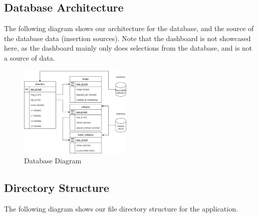 \documentclass[conference]{IEEEtran}
\begin{document}
\newpage
\subsection{Database Architecture}
The following diagram shows our architecture for the database, and the source of the database data (insertion sources). Note that the dashboard is not showcased here, as the dashboard mainly only does selections from the database, and is not a source of data.

\begin{figure}[h]
    \centering
    \includegraphics[width=0.48\textwidth]{images/db_diagram.eps}
    \caption{Database Diagram}
\end{figure}

\subsection{Directory Structure}
The following diagram shows our file directory structure for the application.
\end{document}
